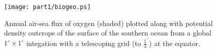 \begin{figure}
\begin{center}
   \texttt{[image: part1/biogeo.ps]}
\end{center}
\caption{Annual air-sea flux of oxygen (shaded) plotted along with
potential density outcrops of the surface of the southern ocean from a
global $1^{\circ}\times 1^{\circ}$ integation with a telescoping
grid (to $\frac{1}{3}^{^\circ}$) at the equator.}
\label{fig:biogeo}
\end{figure}
